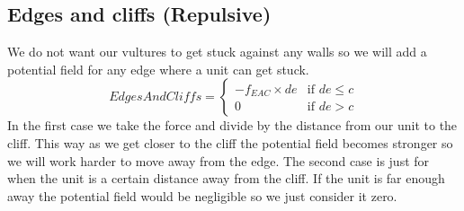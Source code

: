	\subsection*{Edges and cliffs (Repulsive)}
		We do not want our vultures to get stuck against any walls so we will add a potential field for any edge where a unit can get stuck.
		\begin{displaymath}
			EdgesAndCliffs = \begin{cases}
					-f_{EAC} \times {de} & \text{if } de \leq c\\
					0 & \text{if } de > c
				\end{cases}		
		\end{displaymath}
In the first case we take the force and divide by the distance from our unit to the cliff. This way as we get closer to the cliff the potential field becomes stronger so we will work harder to move away from the edge.
The second case is just for when the unit is a certain distance away from the cliff. If the unit is far enough away the potential field would be negligible so we just consider it zero.	
	
